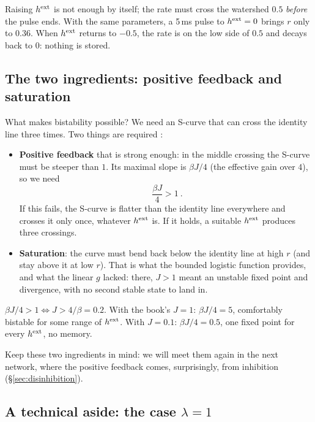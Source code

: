 \begin{pitfall}
Raising $h^{\text{ext}}$ is not enough by itself; the rate must cross the watershed $0.5$ \emph{before} the pulse ends. With the same parameters, a 5\,ms pulse to $h^{\text{ext}}=0$ brings $r$ only to $0.36$.
When $h^{\text{ext}}$ returns to $-0.5$, the rate is on the low side of $0.5$ and decays back to $0$: nothing is stored.
\end{pitfall}

\subsection{The two ingredients: positive feedback and saturation}\label{sec:ingredients}

What makes bistability possible? We need an S-curve that can cross the identity line three times. Two things are required :
\begin{itemize}
  \item \textbf{Positive feedback} that is strong enough: in the middle crossing the S-curve must be steeper than $1$. Its maximal slope is $\beta J/4$ (the effective gain over $4$), so we need
        \[ \boxed{\ \frac{\beta J}{4} > 1\ }. \]
        If this fails, the S-curve is flatter than the identity line everywhere and crosses it only once, whatever $h^{\text{ext}}$ is. If it holds, a suitable $h^{\text{ext}}$ produces three crossings.
  \item \textbf{Saturation}: the curve must bend back below the identity line at high $r$ (and stay above it at low $r$). That is what the bounded logistic function provides,
        and what the linear $g$ lacked: there, $J>1$ meant an unstable fixed point and divergence, with no second stable state to land in.
\end{itemize}

\begin{example}[How much feedback is enough? ($\beta=20$)]
$\beta J/4 > 1 \iff J > 4/\beta = 0.2$. With the book's $J=1$: $\beta J/4 = 5$, comfortably bistable for some range of $h^{\text{ext}}$. With $J=0.1$: $\beta J/4 = 0.5$, one fixed point for every $h^{\text{ext}}$, no memory.
\end{example}

Keep these two ingredients in mind: we will meet them again in the next network, where the positive feedback comes, surprisingly, from inhibition (\S\ref{sec:disinhibition}).

\subsection{A technical aside: the case $\lambda = 1$}

